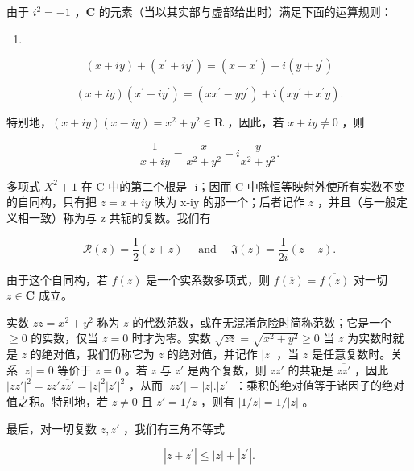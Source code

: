 由于 \(i^2 = -1\) ，\(\mathbf{C}\) 的元素（当以其实部与虚部给出时）满足下面的运算规则：

\begin{enumerate}
\def\labelenumi{(\arabic{enumi})}
\tightlist
\item
\end{enumerate}

\[
(x + i y) + (x ^ {\prime} + i y ^ {\prime}) = (x + x ^ {\prime}) + i (y + y ^ {\prime})\tag{2}
\]

\[
(x + i y) (x ^ {\prime} + i y ^ {\prime}) = (x x ^ {\prime} - y y ^ {\prime}) + i (x y ^ {\prime} + x ^ {\prime} y).
\]

特别地，\((x + iy)(x - iy) = x^{2} + y^{2}\in \mathbf{R}\) ，因此，若 \(x + iy\neq 0\) ，则

\[
\frac {1}{x + i y} = \frac {x}{x ^ {2} + y ^ {2}} - i \frac {y}{x ^ {2} + y ^ {2}}.\tag{3}
\]

多项式 \(X^{2}+1\) 在 C 中的第二个根是 -i；因而 C 中除恒等映射外使所有实数不变的自同构，只有把 \(z=x+iy\) 映为 x-iy 的那一个；后者记作 \(\bar{z}\) ，并且（与一般定义相一致）称为与 z 共轭的复数。我们有

\[
\mathcal {R} (z) = \frac {\mathrm{I}}{2} (z + \bar {z}) \quad \text { and } \quad \mathfrak {J} (z) = \frac {\mathrm{I}}{2 i} (z - \bar {z}).
\]

由于这个自同构，若 \(f(z)\) 是一个实系数多项式，则 \(f(\overline{z}) = \overline{f(z)}\) 对一切 \(z \in \mathbf{C}\) 成立。

实数 \(z\bar{z} = x^2 + y^2\) 称为 \(z\) 的代数范数，或在无混淆危险时简称范数；它是一个 \(\geqslant 0\) 的实数，仅当 \(z = 0\) 时才为零。实数 \(\sqrt{z\bar{z}} = \sqrt{x^2 + y^2} \geqslant 0\) 当 \(z\) 为实数时就是 \(z\) 的绝对值，我们仍称它为 \(z\) 的绝对值，并记作 \(|z|\) ，当 \(z\) 是任意复数时。关系 \(|z| = 0\) 等价于 \(z = 0\) 。若 \(z\) 与 \(z'\) 是两个复数，则 \(zz'\) 的共轭是 \(\overline{zz'}\) ，因此 \(|zz'|^2 = zz' \overline{zz'} = |z|^2 |z'|^2\) ，从而 \(|zz'| = |z|. |z'|\) ：乘积的绝对值等于诸因子的绝对值之积。特别地，若 \(z \neq 0\) 且 \(z' = 1/z\) ，则有 \(|1/z| = 1/|z|\) 。

最后，对一切复数 \(z, z'\) ，我们有三角不等式

\[
\left| z + z ^ {\prime} \right| \leqslant | z | + \left| z ^ {\prime} \right|.\tag{4}
\]

